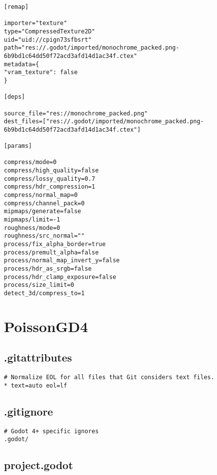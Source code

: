 \begin{lstlisting}
[remap]

importer="texture"
type="CompressedTexture2D"
uid="uid://cpign73sfbsrt"
path="res://.godot/imported/monochrome_packed.png-6b9bd1c64dd50f72acd3afd14d1ac34f.ctex"
metadata={
"vram_texture": false
}

[deps]

source_file="res://monochrome_packed.png"
dest_files=["res://.godot/imported/monochrome_packed.png-6b9bd1c64dd50f72acd3afd14d1ac34f.ctex"]

[params]

compress/mode=0
compress/high_quality=false
compress/lossy_quality=0.7
compress/hdr_compression=1
compress/normal_map=0
compress/channel_pack=0
mipmaps/generate=false
mipmaps/limit=-1
roughness/mode=0
roughness/src_normal=""
process/fix_alpha_border=true
process/premult_alpha=false
process/normal_map_invert_y=false
process/hdr_as_srgb=false
process/hdr_clamp_exposure=false
process/size_limit=0
detect_3d/compress_to=1
\end{lstlisting}

\section{PoissonGD4}

\subsection{.gitattributes}

\begin{lstlisting}
# Normalize EOL for all files that Git considers text files.
* text=auto eol=lf
\end{lstlisting}

\subsection{.gitignore}

\begin{lstlisting}
# Godot 4+ specific ignores
.godot/
\end{lstlisting}

\subsection{project.godot}

